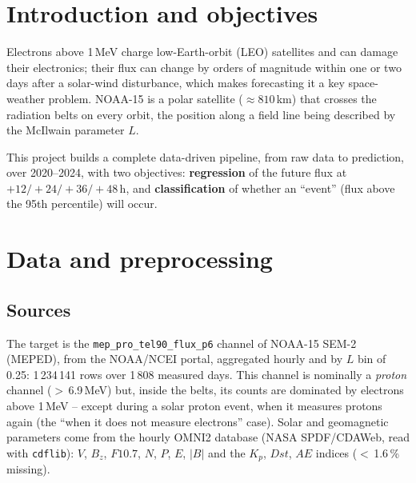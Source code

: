 \documentclass[10pt,a4paper,twocolumn]{article}
\begin{document}

\section{Introduction and objectives}

Electrons above 1\,MeV charge low-Earth-orbit (LEO) satellites and can damage their electronics;
their flux can change by orders of magnitude within one or two days after a solar-wind
disturbance, which makes forecasting it a key space-weather problem. NOAA-15 is a polar satellite
($\approx 810$\,km) that crosses the radiation belts on every orbit, the position along a field
line being described by the McIlwain parameter $L$.

This project builds a complete data-driven pipeline, from raw data to prediction, over 2020--2024,
with two objectives: \textbf{regression} of the future flux at $+12/+24/+36/+48$\,h, and
\textbf{classification} of whether an ``event'' (flux above the 95th percentile) will occur.

\section{Data and preprocessing}

\subsection{Sources}
The target is the \texttt{mep\_pro\_tel90\_flux\_p6} channel of NOAA-15 SEM-2 (MEPED), from the
NOAA/NCEI portal, aggregated hourly and by $L$ bin of 0.25: 1\,234\,141 rows over 1\,808 measured
days. This channel is nominally a \emph{proton} channel ($>$\,6.9\,MeV) but, inside the belts, its
counts are dominated by electrons above 1\,MeV -- except during a solar proton event, when it
measures protons again (the ``when it does not measure electrons'' case). Solar and geomagnetic
parameters come from the hourly OMNI2 database (NASA SPDF/CDAWeb, read with \texttt{cdflib}):
$V$, $B_z$, $F10.7$, $N$, $P$, $E$, $|B|$ and the $K_p$, $Dst$, $AE$ indices ($<$\,1.6\,\% missing).
\end{document}
